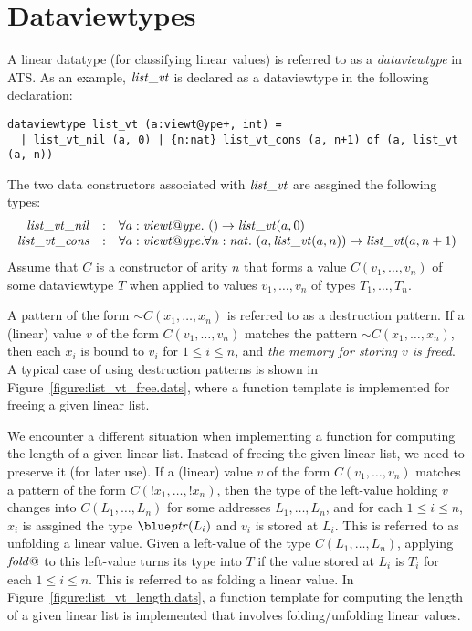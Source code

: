 \section{Dataviewtypes}
A linear datatype (for classifying linear values) is referred to as a {\it
dataviewtype} in ATS. As an example, ${\it list\_vt}$ is declared as a
dataviewtype in the following declaration:
\begin{verbatim}
dataviewtype list_vt (a:viewt@ype+, int) =
  | list_vt_nil (a, 0) | {n:nat} list_vt_cons (a, n+1) of (a, list_vt (a, n))
\end{verbatim}
The two data constructors associated with ${\it list\_vt}$ are assgined the
following types:
\[\begin{array}{rcl}
{\it list\_vt\_nil} & : &
\forall a:{\it viewt@ype}.~()\rightarrow{\it list\_vt}(a, 0) \\
{\it list\_vt\_cons} & : &
\forall a:{\it viewt@ype}.\forall n:{\it nat}.~(a, {\it list\_vt}(a, n))\rightarrow{\it list\_vt}(a, n+1) \\
\end{array}\]
Assume that $C$ is a constructor of arity $n$ that forms a value
$C(v_1,\ldots,v_n)$ of some dataviewtype $T$ when applied to values
$v_1,\ldots,v_n$ of types $T_1,\ldots,T_n$.

A pattern of the form $\sim\!\!C(x_1,\ldots, x_n)$ is referred to as a
destruction pattern.  If a (linear) value $v$ of the form
$C(v_1,\ldots,v_n)$ matches the pattern $\sim\!\!C(x_1,\ldots, x_n)$, then
each $x_i$ is bound to $v_i$ for $1\leq i\leq n$, and {\em the memory for
storing $v$ is freed}. A typical case of using destruction patterns is
shown in Figure~\ref{figure:list_vt_free.dats}, where a function template
is implemented for freeing a given linear list.

We encounter a different situation when implementing a function for
computing the length of a given linear list. Instead of freeing the given
linear list, we need to preserve it (for later use). If a (linear) value
$v$ of the form $C(v_1,\ldots,v_n)$ matches a pattern of the form
$C(!x_1,\ldots,!x_n)$, then the type of the left-value holding $v$ changes
into $C(L_1,\ldots,L_n)$ for some addresses $L_1,\ldots,L_n$, and for each
$1\leq i\leq n$, $x_i$ is assgined the type $\tptr(L_i)$ and $v_i$ is
stored at $L_i$. This is referred to as unfolding a linear value.  Given a
left-value of the type $C(L_1,\ldots,L_n)$, applying ${\it fold@}$ to this
left-value turns its type into $T$ if the value stored at $L_i$ is $T_i$ for
each $1\leq i\leq n$. This is referred to as folding a linear value.  In
Figure~\ref{figure:list_vt_length.dats}, a function template for computing
the length of a given linear list is implemented that involves
folding/unfolding linear values.

